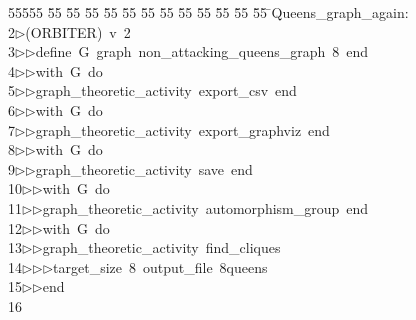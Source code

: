 %
%
\begin{tabbing}
55555 \= 55 \= 55 \= 55 \= 55 \= 55 \= 55 \= 55 \= 55 \= 55 \= 55 \= 55 \= 55 \= \>Queens\_graph\_again:\\[0pt]
2\>$\triangleright$\>(ORBITER)\ v\ 2\ \\[0pt]
3\>$\triangleright$\>$\triangleright$\>define\ G\ graph\ non\_attacking\_queens\_graph\ 8\ end\ \\[0pt]
4\>$\triangleright$\>$\triangleright$\>with\ G\ do\ \\[0pt]
5\>$\triangleright$\>$\triangleright$\>graph\_theoretic\_activity\ export\_csv\ end\ \\[0pt]
6\>$\triangleright$\>$\triangleright$\>with\ G\ do\ \\[0pt]
7\>$\triangleright$\>$\triangleright$\>graph\_theoretic\_activity\ export\_graphviz\ end\ \\[0pt]
8\>$\triangleright$\>$\triangleright$\>with\ G\ do\ \\[0pt]
9\>$\triangleright$\>$\triangleright$\>graph\_theoretic\_activity\ save\ end\ \\[0pt]
10\>$\triangleright$\>$\triangleright$\>with\ G\ do\ \\[0pt]
11\>$\triangleright$\>$\triangleright$\>graph\_theoretic\_activity\ automorphism\_group\ end\ \\[0pt]
12\>$\triangleright$\>$\triangleright$\>with\ G\ do\ \\[0pt]
13\>$\triangleright$\>$\triangleright$\>graph\_theoretic\_activity\ find\_cliques\ \\[0pt]
14\>$\triangleright$\>$\triangleright$\>$\triangleright$\>target\_size\ 8\ output\_file\ 8queens\ \\[0pt]
15\>$\triangleright$\>$\triangleright$\>end\ \\[0pt]
16\>\end{tabbing}
